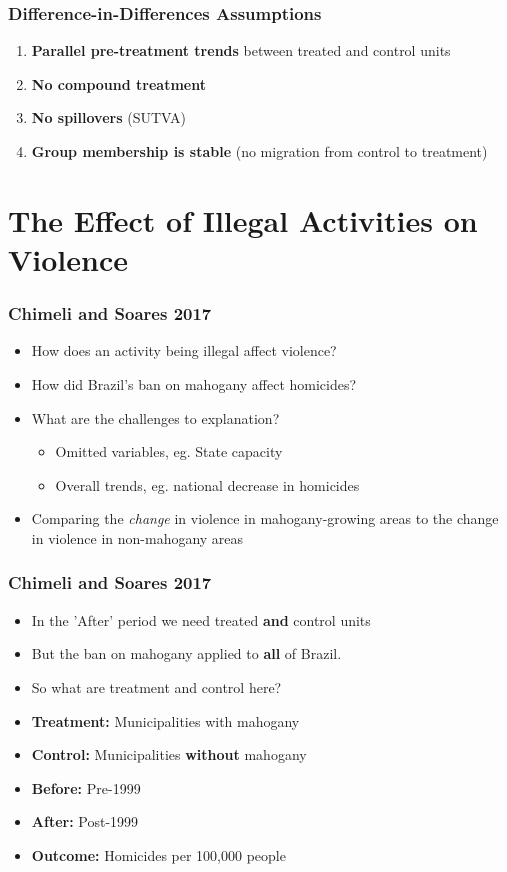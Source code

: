 \documentclass[xcolor=x11names,compress]{beamer}\usepackage[]{graphicx}\usepackage[]{color}
\renewcommand{\(}{\begin{columns}}
\renewcommand{\)}{\end{columns}}
\newcommand{\<}[1]{\begin{column}{#1}}
\renewcommand{\>}{\end{column}}
\begin{document}
\begin{frame}
\frametitle{Difference-in-Differences Assumptions}
\begin{enumerate}
\item \textbf{Parallel pre-treatment trends} between treated and control units
\pause
\item \textbf{No compound treatment}
\pause
\item \textbf{No spillovers} (SUTVA)
\pause
\item \textbf{Group membership is stable} (no migration from control to treatment)
\end{enumerate}
\end{frame}

\section{The Effect of Illegal Activities on Violence}

\begin{frame}
\frametitle{Chimeli and Soares 2017}
\begin{itemize}
\item How does an activity being illegal affect violence?
\pause
\item How did Brazil's ban on mahogany affect homicides?
\pause
\item What are the challenges to explanation?
\pause
\begin{itemize}
\item Omitted variables, eg. State capacity
\pause
\item Overall trends, eg. national decrease in homicides
\pause
\end{itemize}
\item Comparing the \textit{change} in violence in mahogany-growing areas to the change in violence in non-mahogany areas
\end{itemize}
\end{frame}

\begin{frame}
\frametitle{Chimeli and Soares 2017}
\begin{itemize}
\item In the 'After' period we need treated \textbf{and} control units 
\pause
\item But the ban on mahogany applied to \textbf{all} of Brazil.
\pause
\item So what are treatment and control here?
\pause
\item \textbf{Treatment:} \pause Municipalities with mahogany
\pause
\item \textbf{Control:} \pause Municipalities \textbf{without} mahogany
\pause
\item \textbf{Before:} \pause Pre-1999
\pause
\item \textbf{After:} \pause Post-1999
\pause 
\item \textbf{Outcome:} \pause Homicides per 100,000 people
\end{itemize}
\end{frame}
\end{document}
